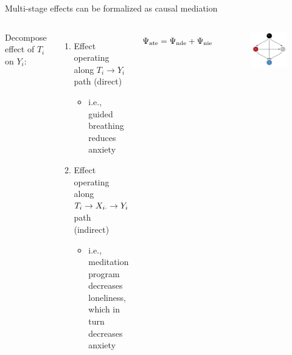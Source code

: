 \documentclass[aspectratio=169]{beamer}
\theoremstyle{remark}
\begin{document}
\begin{frame}{Multi-stage effects can be formalized as causal mediation}
    \begin{columns}
        Decompose effect of $T_i$ on $Y_i$:

        \vspace{4mm}

        \begin{enumerate}
            \item Effect operating along $T_i \to Y_i$ path (direct)
                  \begin{itemize}
                      \item i.e., guided breathing reduces anxiety
                  \end{itemize}
                  \vspace{2mm}
            \item Effect operating along $T_i \to X_{i \cdot} \to Y_i$ path (indirect)

                  \begin{itemize}
                      \item i.e., meditation program decreases loneliness, which in turn decreases anxiety
                  \end{itemize}
        \end{enumerate}

        \begin{equation*}
            \Psi_\mathrm{ate} = \Psi_\mathrm{nde} + \Psi_\mathrm{nie}
        \end{equation*}
        \centering
        \begin{figure}[ht]
            \includegraphics[width=\textwidth]{figures/dags/mediating.png}
        \end{figure}
    \end{columns}
\end{frame}
\end{document}
